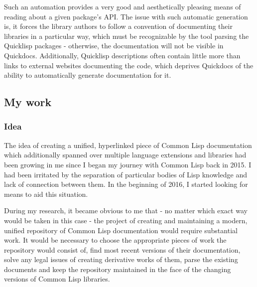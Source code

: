 \documentclass[11pt]{article}
\begin{document}
\begin{enumerate}
Such an automation provides a very good and aesthetically pleasing means of reading about a given package's API. The issue with such automatic generation is, it forces the library authors to follow a convention of documenting their libraries in a particular way, which must be recognizable by the tool parsing the Quicklisp packages - otherwise, the documentation will not be visible in Quickdocs. Additionally, Quicklisp descriptions often contain little more than links to external websites documenting the code, which deprives Quickdocs of the ability to automatically generate documentation for it.
\end{enumerate}
\subsection{My work}
\label{sec:orgd5c3262}
\subsubsection{Idea}
\label{sec:org9ff71fa}
The idea of creating a unified, hyperlinked piece of Common Lisp documentation which additionally spanned over multiple language extensions and libraries had been growing in me since I began my journey with Common Lisp back in 2015. I had been irritated by the separation of particular bodies of Lisp knowledge and lack of connection between them. In the beginning of 2016, I started looking for means to aid this situation.

During my research, it became obvious to me that - no matter which exact way would be taken in this case - the project of creating and maintaining a modern, unified repository of Common Lisp documentation would require substantial work. It would be necessary to choose the appropriate pieces of work the repository would consist of, find most recent versions of their documentation, solve any legal issues of creating derivative works of them, parse the existing documents and keep the repository maintained in the face of the changing versions of Common Lisp libraries.
\end{document}
